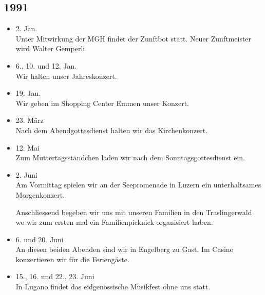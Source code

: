 \subsection*{1991}

\begin{history}


      \begin{itemize}

            \item 2. Jan.\\
                  Unter Mitwirkung der MGH findet der Zunftbot statt. Neuer
                  Zunftmeister wird Walter Gemperli.

            \item 6., 10. und 12. Jan.\\
                  Wir halten unser Jahreskonzert.

            \item 19. Jan.\\
                  Wir geben im Shopping Center Emmen unser Konzert.

            \item 23. März\\
                  Nach dem Abendgottesdienst halten wir das Kirchenkonzert.

            \item 12. Mai\\
                  Zum Muttertagsständchen laden wir nach dem
                  Sonntagsgottesdienst ein.

            \item 2. Juni\\
                  Am Vormittag spielen wir an der Seepromenade in Luzern ein
                  unterhaltsames Morgenkonzert.

                  Anschliessend begeben wir uns mit unseren Familien in den
                  Traslingerwald wo wir zum ersten mal ein Familienpicknick
                  organisiert haben.

            \item 6. und 20. Juni\\
                  An diesen beiden Abenden sind wir in Engelberg zu Gast. Im
                  Casino konzertieren wir für die Feriengäste.

            \item 15., 16. und 22., 23. Juni\\
                  In Lugano findet das eidgenössische Musikfest ohne uns statt.


\end{itemize}
\end{history}
